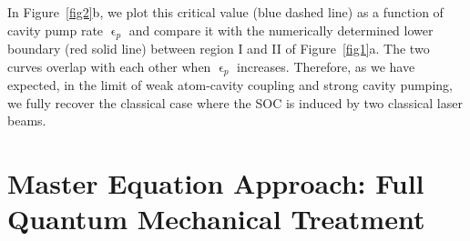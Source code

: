 \documentclass[atoms,article,accept,moreauthors,pdftex,12pt,a4paper]{mdpi}
\begin{document}
In Figure~\ref{fig2}b, we plot this critical value (blue dashed line) as a function of cavity pump rate $\upvarepsilon_p$ and compare it with the numerically determined lower boundary (red solid line) between region I and II of Figure~\ref{fig1}a. The two curves overlap with each other when $\upvarepsilon_p$ increases. Therefore, as we have expected, in the limit of weak atom-cavity coupling and strong cavity pumping, we fully recover the classical case where the SOC is induced by two classical laser beams.



\section{Master Equation Approach: Full Quantum Mechanical Treatment } \label{master}
\end{document}
